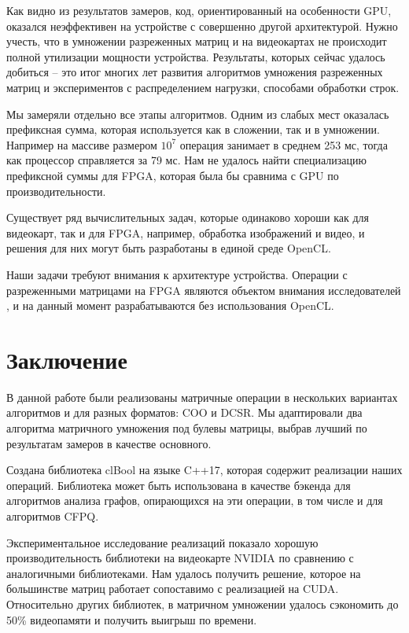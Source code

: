 \documentclass[14pt]{extarticle}
\newcommand{\sectionbreak}{\clearpage}
\begin{document}
	
	Как видно из результатов замеров, код, ориентированный на особенности GPU, оказался неэффективен на устройстве с совершенно другой архитектурой. Нужно учесть, что в умножении разреженных матриц и на видеокартах не происходит полной утилизации мощности устройства. Результаты, которых сейчас удалось добиться -- это итог многих лет развития алгоритмов умножения разреженных матриц и экспериментов с распределением нагрузки, способами обработки строк. 
	
	Мы замеряли отдельно все этапы алгоритмов. Одним из слабых мест оказалась префиксная сумма, которая используется как в сложении, так и в умножении. Например на массиве размером $10^7$ операция занимает в среднем 253 мс, тогда как процессор справляется за 79 мс. Нам не удалось найти специализацию префиксной суммы для FPGA, которая была бы сравнима с GPU по производительности.
	
	Существует ряд вычислительных задач, которые одинаково хороши как для видеокарт, так и для FPGA, например, обработка изображений и видео, и решения для них могут быть разработаны в единой среде OpenCL. 
	
	Наши задачи требуют внимания к архитектуре устройства. Операции с разреженными матрицами на FPGA являются объектом внимания исследователей \cite{jamro}, и на данный момент разрабатываются без использования OpenCL.
		

\sectionbreak

\section*{Заключение}
\label{sec:conclusion}
	
	В данной работе были реализованы матричные операции в нескольких вариантах алгоритмов и для разных форматов: COO и DCSR. Мы адаптировали два алгоритма матричного умножения под булевы матрицы, выбрав лучший по результатам замеров в качестве основного.
		
	Создана библиотека clBool на языке C++17, которая содержит реализации наших операций. Библиотека может быть использована в качестве бэкенда для алгоритмов анализа графов, опирающихся на эти операции, в том числе и для алгоритмов CFPQ.
	
	Экспериментальное исследование реализаций показало хорошую производительность библиотеки на видеокарте NVIDIA по сравнению с аналогичными библиотеками. Нам удалось получить решение, которое на большинстве матриц работает сопоставимо с реализацией на CUDA. Относительно других библиотек, в матричном умножении удалось сэкономить до 50\% видеопамяти и получить выигрыш по времени.
	
\end{document}
